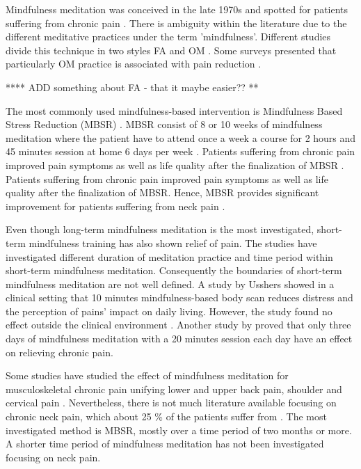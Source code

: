 Mindfulness meditation was conceived in the late 1970s and spotted for patients suffering from chronic pain \cite{Chiesa2010}. There is ambiguity within the literature due to the different meditative practices under the term 'mindfulness'. Different studies divide this technique in two styles FA and OM \cite{Lutz2008,Zeidan2012}. Some surveys presented that particularly OM practice is associated with pain reduction \cite{Grant2009,Perlman2010}. 

 **** ADD something about FA - that it maybe easier?? **

The most commonly used mindfulness-based intervention is Mindfulness Based Stress Reduction (MBSR) \cite{Cramer2012}. MBSR consist of 8 or 10 weeks of mindfulness meditation where the patient have to attend once a week a course for 2 hours and 45 minutes session at home 6 days per week \cite{Kabat1982, Chiesa2010}. Patients suffering from chronic pain improved pain symptoms as well as life quality after the finalization of MBSR \cite{Zeidan2012}.
Patients suffering from chronic pain improved pain symptoms as well as life quality after the finalization of MBSR. \cite{Zeidan2012} 
%
Hence, MBSR provides significant improvement for patients suffering from neck pain \cite{Rosenzweig2010}.

Even though long-term mindfulness meditation is the most investigated, short-term mindfulness training has also shown relief of pain. The studies have investigated different duration of meditation practice and time period within short-term mindfulness meditation. Consequently the boundaries of short-term mindfulness meditation are not well defined. A study by Usshers \cite{Ussher2012} showed in a clinical setting that 10 minutes mindfulness-based body scan reduces distress and the perception of pains’ impact on daily living. However, the study found no effect outside the clinical environment \cite{Ussher2012}. Another study by \cite{Zeidan2012} proved that only three days of mindfulness meditation with a 20 minutes session each day have an effect on relieving chronic pain. 

Some studies have studied the effect of mindfulness meditation for musculoskeletal chronic pain unifying lower and upper back pain, shoulder and cervical pain \cite{Chiesa2010}. Nevertheless, there is not much literature available focusing on chronic neck pain, which about 25 \% of the patients suffer from \cite{Macfarlanea2016}. The most investigated method is MBSR, mostly over a time period of two months or more. A shorter time period of mindfulness meditation has not been investigated focusing on neck pain.

